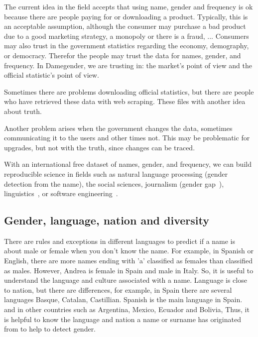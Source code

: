 \documentclass[a4paper]{article}
\begin{document}
The current idea in the field accepts that using name, gender and
frequency is ok because there are people paying for or downloading
a product. Typically, this is an acceptable assumption, although
the consumer may purchase a bad product due to a good marketing
strategy, a monopoly or there is a fraud, ... Consumers may also 
trust in the government statistics regarding the economy,
demography, or democracy. Therefor the people may trust the data
for names, gender, and frequency. In Damegender, we are trusting
in: the market's point of view and the official statistic's
point of view.

Sometimes there are problems downloading official statistics, but
there are people who have retrieved these data with web scraping.
These files with another idea about truth.

Another problem arises when the government changes the data,
sometimes communicating it to the users and other times
not. This may be problematic for upgrades, but not with the truth,
since changes can be traced. 

With an international free dataset of names, gender, and frequency,
we can build reproducible science in fields such as natural language
processing (gender detection from the name), the social sciences, 
journalism (gender
gap~\cite{holman2018gender,mislove2011understanding,niemi2017gendered,de2014genero}),
linguistics~\cite{lawson2005russian,krueger1962mongolian,van2020gender,agyekum2006sociolinguistic,fraser1987lexicon},
or software engineering~\cite{vasilescu2012gender}.

\subsection{Gender, language, nation and diversity}
\label{sec:diversity}

There are rules and exceptions in different languages to predict if
a name is about male or female when you don't know the name. For example,
in Spanish or English, there are more names ending with 'a' classified as
females than classified as males. However, Andrea is female in Spain and
male in Italy. So, it is useful to understand the language and culture
associated with a name. Language is close to nation, but there are
differences, for example, in Spain there are several languages Basque,
Catalan, Castillian. Spanish is the main language in Spain.
and in other countries such as Argentina, Mexico, Ecuador and Bolivia,
Thus, it is helpful to know the language and nation a name or surname
has originated from to help to detect gender.
\end{document}
